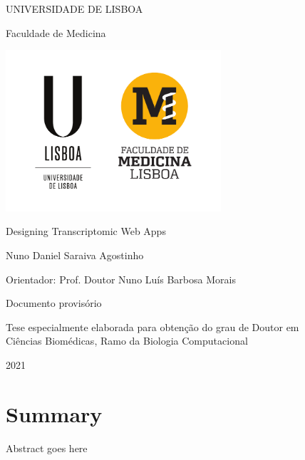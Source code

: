 \documentclass[12pt, twoside]{report}
\begin{document}
\begin{titlepage}
    \begin{center}
        \vspace*{-.2cm}
        UNIVERSIDADE DE LISBOA
        
        Faculdade de Medicina
        
        \includegraphics[width=0.6\textwidth]{images/logo/ulisboa}
        
        \vspace{1.8cm}
        Designing Transcriptomic Web Apps

        \vspace{1.1cm}        
            
        \vspace{0.9cm}            
        Nuno Daniel Saraiva Agostinho
    \end{center}

    \vspace{0.9cm}
    Orientador: Prof. Doutor Nuno Luís Barbosa Morais
    
    \vspace{2.2cm}
    \begin{center}
        Documento provisório
        
        Tese especialmente elaborada para obtenção do grau de Doutor em\\
        Ciências Biomédicas, Ramo da Biologia Computacional
            
        \vfill
        2021
        \vspace{.7cm}    
    \end{center}
\end{titlepage}

\tableofcontents



\chapter*{Summary}
Abstract goes here
\end{document}
